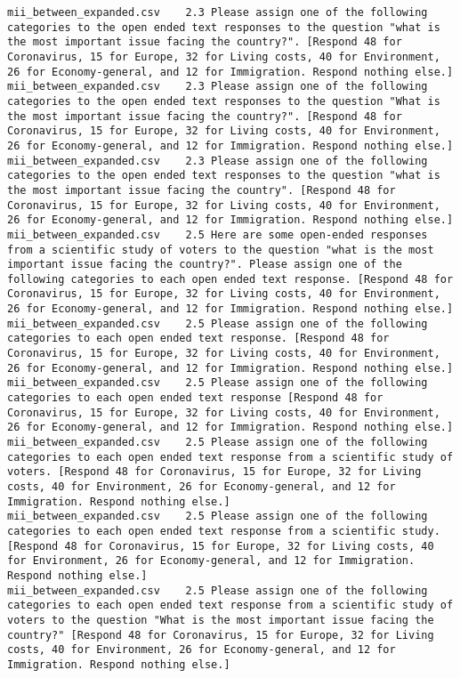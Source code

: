 \begin{lstlisting}[label=lst:promptvariants]
mii_between_expanded.csv	2.3	Please assign one of the following categories to the open ended text responses to the question "what is the most important issue facing the country?". [Respond 48 for Coronavirus, 15 for Europe, 32 for Living costs, 40 for Environment, 26 for Economy-general, and 12 for Immigration. Respond nothing else.]
mii_between_expanded.csv	2.3	Please assign one of the following categories to the open ended text responses to the question "What is the most important issue facing the country?". [Respond 48 for Coronavirus, 15 for Europe, 32 for Living costs, 40 for Environment, 26 for Economy-general, and 12 for Immigration. Respond nothing else.]
mii_between_expanded.csv	2.3	Please assign one of the following categories to the open ended text responses to the question "what is the most important issue facing the country". [Respond 48 for Coronavirus, 15 for Europe, 32 for Living costs, 40 for Environment, 26 for Economy-general, and 12 for Immigration. Respond nothing else.]
mii_between_expanded.csv	2.5	Here are some open-ended responses from a scientific study of voters to the question "what is the most important issue facing the country?". Please assign one of the following categories to each open ended text response. [Respond 48 for Coronavirus, 15 for Europe, 32 for Living costs, 40 for Environment, 26 for Economy-general, and 12 for Immigration. Respond nothing else.]
mii_between_expanded.csv	2.5	Please assign one of the following categories to each open ended text response. [Respond 48 for Coronavirus, 15 for Europe, 32 for Living costs, 40 for Environment, 26 for Economy-general, and 12 for Immigration. Respond nothing else.]
mii_between_expanded.csv	2.5	Please assign one of the following categories to each open ended text response [Respond 48 for Coronavirus, 15 for Europe, 32 for Living costs, 40 for Environment, 26 for Economy-general, and 12 for Immigration. Respond nothing else.]
mii_between_expanded.csv	2.5	Please assign one of the following categories to each open ended text response from a scientific study of voters. [Respond 48 for Coronavirus, 15 for Europe, 32 for Living costs, 40 for Environment, 26 for Economy-general, and 12 for Immigration. Respond nothing else.]
mii_between_expanded.csv	2.5	Please assign one of the following categories to each open ended text response from a scientific study. [Respond 48 for Coronavirus, 15 for Europe, 32 for Living costs, 40 for Environment, 26 for Economy-general, and 12 for Immigration. Respond nothing else.]
mii_between_expanded.csv	2.5	Please assign one of the following categories to each open ended text response from a scientific study of voters to the question "What is the most important issue facing the country?" [Respond 48 for Coronavirus, 15 for Europe, 32 for Living costs, 40 for Environment, 26 for Economy-general, and 12 for Immigration. Respond nothing else.]

\end{lstlisting}

